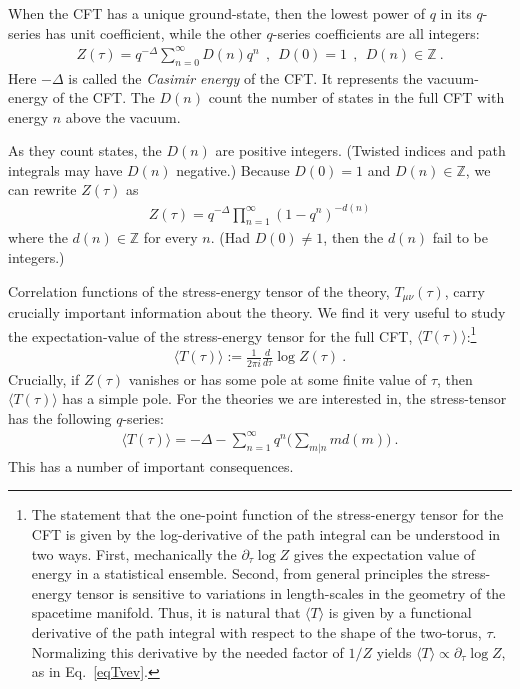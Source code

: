 \documentclass[11pt,a4paper]{article}
\def\Z{\mathbb{Z}}
\begin{document}
When the CFT has a unique ground-state, then the lowest power of $q$ in its $q$-series has unit coefficient, while the other $q$-series coefficients are all integers:
\begin{align}
Z(\tau) = q^{-\Delta} \sum_{n = 0}^{\infty} D(n) q^n~~,~~D(0) = 1~~,~~D(n) \in \Z~.
\label{eqZsig}
\end{align}
Here $-\Delta$ is called the {\em Casimir energy} of the CFT. It represents the vacuum-energy of the CFT. The $D(n)$ count the number of states in the full CFT with energy $n$ above the vacuum.

As they count states, the $D(n)$ are positive integers. (Twisted indices and path integrals may have $D(n)$ negative.) Because $D(0) = 1$ and $D(n) \in \Z$, we can rewrite $Z(\tau)$ as
\begin{align}
Z(\tau) = q^{-\Delta} \prod_{n = 1}^{\infty} (1-q^n)^{-d(n)} 
\label{eqZpi}
\end{align}
where the $d(n) \in \Z$ for every $n$. (Had $D(0) \neq 1$, then the $d(n)$ fail to be integers.)

Correlation functions of the stress-energy tensor of the theory, $T_{\mu \nu}(\tau)$, carry crucially important information about the theory. We find it very useful to study the expectation-value of the stress-energy tensor for the full CFT, $\langle T(\tau) \rangle$:\footnote{The statement that the one-point function of the stress-energy tensor for the CFT is given by the log-derivative of the path integral can be understood in two ways. First, mechanically the $\partial_{\tau} \log Z$ gives the expectation value of energy in a statistical ensemble. Second, from general principles the stress-energy tensor is sensitive to variations in length-scales in the geometry of the spacetime manifold. Thus, it is natural that $\langle T \rangle$ is given by a functional derivative of the path integral with respect to the shape of the two-torus, $\tau$. Normalizing this derivative by the needed factor of $1/Z$ yields $\langle T \rangle \propto \partial_{\tau} \log Z$, as in Eq.~\eqref{eqTvev}.}
\begin{align}
\langle T(\tau) \rangle:= \frac{1}{2\pi i} \frac{d}{d\tau} \log Z(\tau) ~.
\label{eqTvev}
\end{align}
Crucially, if $Z(\tau)$ vanishes or has some pole at some finite value of $\tau$, then $\langle T(\tau) \rangle$ has a simple pole. For the theories we are interested in, the stress-tensor has the following $q$-series:
\begin{align}
\langle T(\tau) \rangle = -\Delta -\sum_{n = 1}^{\infty} q^n \bigg( \sum_{m|n} m d(m) \bigg)~.
\end{align}
This has a number of important consequences. 
\end{document}
